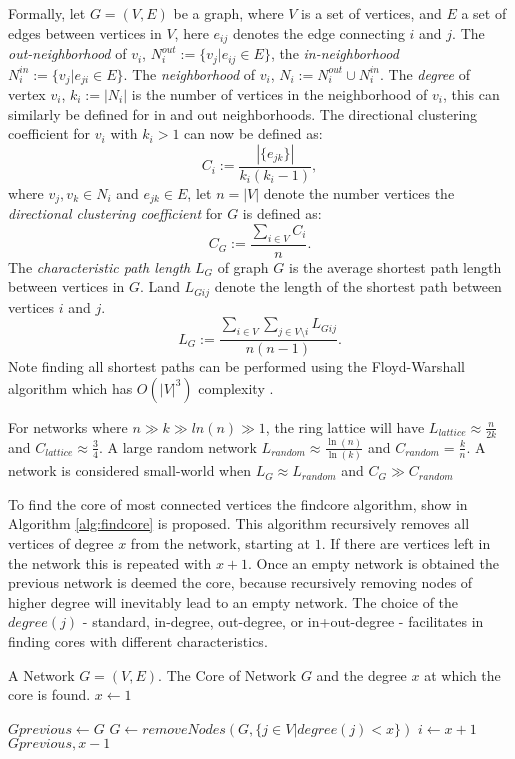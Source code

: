 Formally, let $G=(V, E)$ be a graph, where $V$ is a set of vertices, and $E$ a set of edges between vertices in $V$, here $e_{ij}$ denotes the edge connecting $i$ and $j$.  The \textit{out-neighborhood} of $v_i$, $N_i^{out}:=\{v_j|e_{ij}\in E\}$, the \textit{in-neighborhood} $N_i^{in}:=\{v_j|e_{ji}\in E\}$. The \textit{neighborhood} of $v_i$, $N_i:=N_i^{out}\cup N_i^{in}$. The \textit{degree} of vertex $v_i$, $k_i:=|N_i|$ is the number of vertices in the neighborhood of $v_i$, this can similarly be defined for in and out neighborhoods. The directional clustering coefficient for $v_i$ with $k_i>1$ can now be defined as:
$$C_i :=\frac{|\{e_{jk}\}|}{k_i(k_i-1)},$$
where $v_j,v_k\in N_i$ and $e_{jk}\in E$, let $n=|V|$ denote the number vertices the \textit{directional clustering coefficient} for $G$ is defined as:
$$C_G:=\frac{\sum_{i\in V} C_i}{n}.$$
The \textit{characteristic path length} $L_G$ of graph $G$ is the average shortest path length between vertices in $G$. Land  $L_{Gij}$ denote the length of the shortest path between vertices $i$ and $j$. 
$$L_G:= \frac{\sum_{i\in V} \sum_{j \in V\setminus i}L_{Gij}}{n(n-1)}.$$ 
Note finding all shortest paths can be performed using the Floyd-Warshall algorithm which has $O(|V|^3)$ complexity \cite{Floyd}.

For networks where $n\gg k\gg ln(n) \gg1$, the ring lattice will have $L_{lattice}\approx\frac{n}{2k}$ and $C_{lattice}\approx\frac{3}{4}$.
A large random network  $ L_{random}\approx\frac{\ln(n)}{\ln(k)}$ and $C_{random}=\frac{k}{n}$. A network is considered small-world when $L_G\approx L_{random}$ and $C_G \gg C_{random}$

To find the core of most connected vertices the findcore algorithm, show in Algorithm \ref{alg:findcore} is proposed. This algorithm recursively removes all vertices of degree $x$ from the network, starting at $1$. If there are vertices left in the network this is repeated with  $x+1$. Once an empty network is obtained the previous network is deemed the core, because recursively removing nodes of higher degree will inevitably lead to an empty network. The choice of the $degree(j)$ - standard, in-degree, out-degree,  or in+out-degree - facilitates in finding cores with different characteristics.

\newcommand{\FindCore}{\ensuremath{\mbox{\sc FindCore}}}
\begin{algorithm}[htb]
\caption{$\FindCore(Network)$}\label{alg:findcore}
\begin{algorithmic}
\REQUIRE A Network $G=(V,E)$.
\ENSURE The Core of Network $G$ and the degree $x$ at which the core is found.
\medskip
\STATE $x\gets 1$
	
	\STATE $Gprevious \gets G$
		\STATE $G\gets removeNodes(G, \{j\in V | degree(j)<x\})$ 
	\ENDWHILE
	\STATE $i \gets x+1$
\ENDWHILE
\RETURN $Gprevious, x-1$
\end{algorithmic}
\end{algorithm}